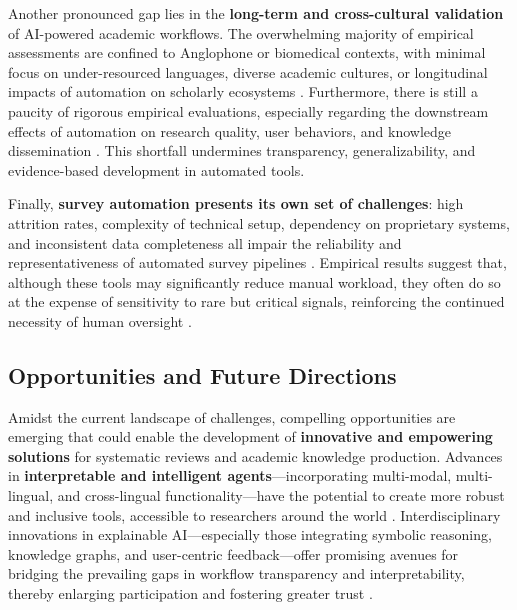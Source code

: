 Another pronounced gap lies in the \textbf{long-term and cross-cultural validation} of AI-powered academic workflows. The overwhelming majority of empirical assessments are confined to Anglophone or biomedical contexts, with minimal focus on under-resourced languages, diverse academic cultures, or longitudinal impacts of automation on scholarly ecosystems \cite{ref110,ref117}. Furthermore, there is still a paucity of rigorous empirical evaluations, especially regarding the downstream effects of automation on research quality, user behaviors, and knowledge dissemination \cite{ref73,ref110,ref117}. This shortfall undermines transparency, generalizability, and evidence-based development in automated tools.

Finally, \textbf{survey automation presents its own set of challenges}: high attrition rates, complexity of technical setup, dependency on proprietary systems, and inconsistent data completeness all impair the reliability and representativeness of automated survey pipelines \cite{ref81,ref117}. Empirical results suggest that, although these tools may significantly reduce manual workload, they often do so at the expense of sensitivity to rare but critical signals, reinforcing the continued necessity of human oversight \cite{ref110,ref117}.

\subsection{Opportunities and Future Directions}

Amidst the current landscape of challenges, compelling opportunities are emerging that could enable the development of \textbf{innovative and empowering solutions} for systematic reviews and academic knowledge production. Advances in \textbf{interpretable and intelligent agents}—incorporating multi-modal, multi-lingual, and cross-lingual functionality—have the potential to create more robust and inclusive tools, accessible to researchers around the world \cite{ref38,ref41,ref61,ref62,ref63,ref64,ref68,ref70,ref76,ref78,ref80,ref81,ref82,ref84,ref86,ref87,ref88,ref89,ref90,ref91,ref92,ref93,ref94,ref95,ref99,ref100,ref102,ref103,ref104,ref105,ref108,ref109,ref110,ref111,ref112,ref113,ref114,ref115,ref117}. Interdisciplinary innovations in explainable AI—especially those integrating symbolic reasoning, knowledge graphs, and user-centric feedback—offer promising avenues for bridging the prevailing gaps in workflow transparency and interpretability, thereby enlarging participation and fostering greater trust \cite{ref61,ref68,ref70,ref76,ref87,ref88,ref89,ref90,ref94,ref104,ref105,ref108,ref110,ref111,ref113,ref114,ref117}.

